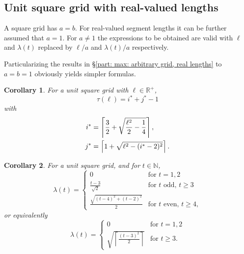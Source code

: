 \documentclass[12pt, a4paper]{article}
\let\Re\relax %
\DeclareMathOperator{\Re}{Re} %
\newcommand{\funt}{\tau} %
\newcommand{\funl}{\lambda} %
\newcommand{\len}{\ell} %
\newcommand{\tiles}{t} %
\newcommand{\isoli}{i^\ast}
\newcommand{\jsoli}{j^\ast}
\newtheorem{corollary}{Corollary}%
\begin{document}
\subsection{Unit square grid with real-valued lengths}
\label{part: max: unit square grid, real lengths}

A square grid has $a=b$. For real-valued segment lengths it can be further assumed that $a=1$. For $a \neq 1$ the expressions to be obtained are valid with $\len$ and $\funl(\tiles)$ replaced by $\len/a$ and $\funl(\tiles)/a$ respectively.

Particularizing the results in \S\ref{part: max: arbitrary grid, real lengths} to $a=b=1$ obviously yields simpler formulas.

\begin{corollary}
\label{cor: funt, sq, form}
For a unit square grid with $\len \in \mathbb R^+$,
\begin{equation}
\label{eq: cor: funt, sq, form}
\funt(\len) = \isoli+\jsoli-1
\end{equation}
with
\begin{align}
\label{eq: cor: funt, sq, form; i}
\isoli &= \left\lceil \frac 3 2 + \Re\sqrt{\frac{\len^2}{2} - \frac 1 4} \right\rceil, \\
\label{eq: cor: funt, sq, form; j}
\jsoli &= \left\lceil 1 + \sqrt{\len^2-(\isoli-2)^2} \right\rceil.
\end{align}
\end{corollary}

\begin{corollary}
\label{theo: funl, sq, form}
For a unit square grid, and for $\tiles \in \mathbb N$,
\begin{equation}
\funl(\tiles) = \begin{cases}
\displaystyle
0 & \text{for } \tiles =1, 2 \\[1.4mm]
\displaystyle
\frac{\tiles-3}{\sqrt{2}} & \text{for } \tiles \text{ odd, } \tiles \geq 3 \\[4.5mm]
\displaystyle
\frac{\sqrt{(\tiles-4)^2+(\tiles-2)^2}} {2} & \text{for } \tiles \text{ even, } \tiles \geq 4,
\end{cases}
\end{equation}
or equivalently
\begin{equation}
\label{eq: theo: funt, sq, form; funl}
\funl(\tiles) = \begin{cases}
\displaystyle
0 & \text{for } \tiles =1, 2 \\[1.4mm]
\displaystyle
\sqrt{\left\lceil \frac{(\tiles-3)^2} {2} \right\rceil} & \text{for } \tiles \geq 3.
\end{cases}
\end{equation}
\end{corollary}
\end{document}
